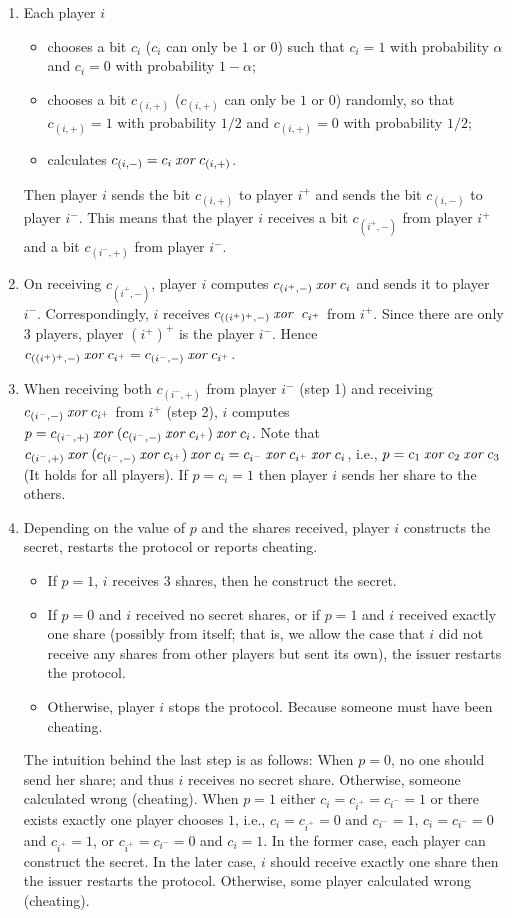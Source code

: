 \begin{enumerate}
\item Each player $i$
\begin{itemize}
\item chooses a bit $c_i$ ($c_i$ can only be $1$ or $0$) such that $c_i =1$ with probability $\alpha$ and $c_i = 0$ with probability $1-\alpha$; 
\item chooses a bit $c_{(i,+)}$ ($c_{(i,+)}$ can only be $1$ or $0$) randomly, so that $c_{(i,+)}=1$ with probability $1/2$ and $c_{(i,+)}=0$ with probability $1/2$;
\item calculates $c_{(i,-)}= c_i \mathbin{\mathit{xor}} c_{(i,+)}$. 
\end{itemize}
Then player $i$ sends the bit $c_{(i,+)}$ to player $i^+$ and sends the bit $c_{(i,-)}$ to player $i^-$. This means that the player $i$ receives a bit $c_{(i^+,-)}$ from player $i^+$ and a bit $c_{(i^-,+)}$ from player $i^-$.
\item On receiving $c_{(i^+,-)}$, player $i$ computes $c_{(i^+,-)} \mathbin{\mathit{xor}} c_i$ and sends it to player $i^-$. Correspondingly, $i$ receives $c_{((i^+)^+, -)} \xor\ c_{i^+}$ from $i^+$. Since there are only $3$ players, player $(i^+)^+$ is the player $i^-$. Hence $c_{((i^+)^+, -)} \mathbin{\mathit{xor}} c_{i^+}=c_{(i^-,-)} \mathbin{\mathit{xor}} c_{i^+}$.
\item When receiving both $c_{(i^-,+)}$ from player $i^-$ (step 1) and receiving $c_{(i^-,-)} \mathbin{\mathit{xor}} c_{i^+}$ from $i^+$ (step 2), $i$ computes $p = c_{(i^-,+)} \mathbin{\mathit{xor}} (c_{(i^-,-)}\mathbin{\mathit{xor}} c_{i^+})\mathbin{\mathit{xor}} c_i$. Note that $ c_{(i^-,+)} \mathbin{\mathit{xor}} (c_{(i^-,-)}\mathbin{\mathit{xor}} c_{i^+})\mathbin{\mathit{xor}} c_i=c_{i^-} \mathbin{\mathit{xor}} c_{i^+}\mathbin{\mathit{xor}} c_i$, i.e., $p=c_1 \mathbin{\mathit{xor}} c_2 \mathbin{\mathit{xor}} c_3$ (It holds for all players).
If $p = c_i = 1$ then player $i$ sends her share to the others.
\item Depending on the value of $p$ and the shares received, player $i$ constructs the secret, restarts the protocol or reports cheating.
\begin{itemize}
\item If $p=1$, $i$ receives $3$ shares, then he construct the secret.
\item If $p =0$ and $i$ received no secret shares, or if $p =1$ and $i$ received exactly one share (possibly from itself; that is, we allow the case that $i$ did not receive any shares from other players but sent its own), the issuer restarts the protocol. 
\item Otherwise, player $i$ stops the protocol. Because someone must have been cheating. 
\end{itemize}
The intuition behind the last step is as follows: When $p=0$, no one should send her share; and thus $i$ receives no secret share. Otherwise, someone calculated wrong (cheating).
When $p=1$ either $c_i=c_{i^+}=c_{i^-}=1$ or there exists exactly one player chooses $1$, i.e., $c_i=c_{i^+}=0$ and $c_{i^-}=1$, $c_i=c_{i^-}=0$ and $c_{i^+}=1$, or $c_{i^+}=c_{i^-}=0$ and $c_i=1$. 
In the former case, each player can construct the secret. In the later case, $i$ should receive exactly one share then the issuer restarts the protocol. Otherwise, some player calculated wrong (cheating). 
\end{enumerate}


